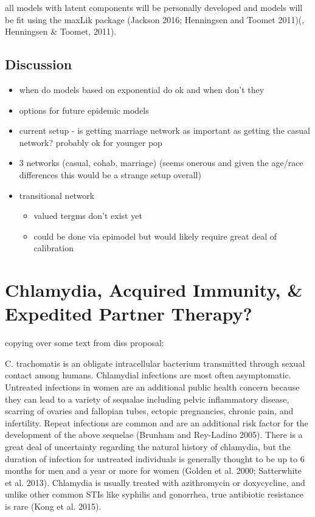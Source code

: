 \documentclass [11pt, proquest] {uwthesis}[2015/03/03]
\providecommand{\tightlist}{%
  \setlength{\itemsep}{0pt}\setlength{\parskip}{0pt}}
\begin{document}
all models with latent components will be personally developed and
models will be fit using the maxLik package (Jackson 2016; Henningsen
and Toomet 2011)(, Henningsen \& Toomet, 2011).

\section{Discussion}\label{discussion}
\begin{itemize}
\tightlist
\item
  when do models based on exponential do ok and when don't they
\item
  options for future epidemic models
\item
  current setup - is getting marriage network as important as getting
  the casual network? probably ok for younger pop
\item
  3 networks (casual, cohab, marriage) (seems onerous and given the
  age/race differences this would be a strange setup overall)
\item
  transitional network
  \begin{itemize}
  \tightlist
  \item
    valued tergms don't exist yet
  \item
    could be done via epimodel but would likely require great deal of
    calibration
  \end{itemize}
\end{itemize}
\chapter{Chlamydia, Acquired Immunity, \& Expedited Partner
Therapy?}\label{ept}

copying over some text from diss proposal:

C. trachomatis is an obligate intracellular bacterium transmitted
through sexual contact among humans. Chlamydial infections are most
often asymptomatic. Untreated infections in women are an additional
public health concern because they can lead to a variety of sequalae
including pelvic inflammatory disease, scarring of ovaries and fallopian
tubes, ectopic pregnancies, chronic pain, and infertility. Repeat
infections are common and are an additional risk factor for the
development of the above sequelae (Brunham and Rey-Ladino 2005). There
is a great deal of uncertainty regarding the natural history of
chlamydia, but the duration of infection for untreated individuals is
generally thought to be up to 6 months for men and a year or more for
women (Golden et al. 2000; Satterwhite et al. 2013). Chlamydia is
usually treated with azithromycin or doxycycline, and unlike other
common STIs like syphilis and gonorrhea, true antibiotic resistance is
rare (Kong et al. 2015).
\end{document}
